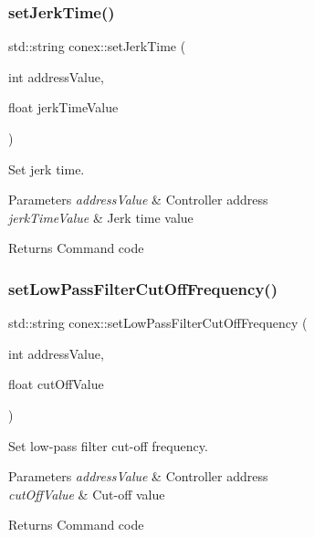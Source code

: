 \subsubsection{\texorpdfstring{set\+Jerk\+Time()}{setJerkTime()}}
{\footnotesize\ttfamily std\+::string conex\+::set\+Jerk\+Time (\begin{DoxyParamCaption}\item[{int}]{address\+Value,  }\item[{float}]{jerk\+Time\+Value }\end{DoxyParamCaption})}



Set jerk time. 


\begin{DoxyParams}{Parameters}
{\em address\+Value} & Controller address \\
\hline
{\em jerk\+Time\+Value} & Jerk time value \\
\hline
\end{DoxyParams}
\begin{DoxyReturn}{Returns}
Command code 
\end{DoxyReturn}
\mbox{\label{namespaceconex_a32f3870ece6ee316eff312c20fe069d3}} 
\subsubsection{\texorpdfstring{set\+Low\+Pass\+Filter\+Cut\+Off\+Frequency()}{setLowPassFilterCutOffFrequency()}}
{\footnotesize\ttfamily std\+::string conex\+::set\+Low\+Pass\+Filter\+Cut\+Off\+Frequency (\begin{DoxyParamCaption}\item[{int}]{address\+Value,  }\item[{float}]{cut\+Off\+Value }\end{DoxyParamCaption})}



Set low-\/pass filter cut-\/off frequency. 


\begin{DoxyParams}{Parameters}
{\em address\+Value} & Controller address \\
\hline
{\em cut\+Off\+Value} & Cut-\/off value \\
\hline
\end{DoxyParams}
\begin{DoxyReturn}{Returns}
Command code 
\end{DoxyReturn}
\mbox{\label{namespaceconex_a70c1cfd0edc011bcf941ed9c4a63efe2}} 

